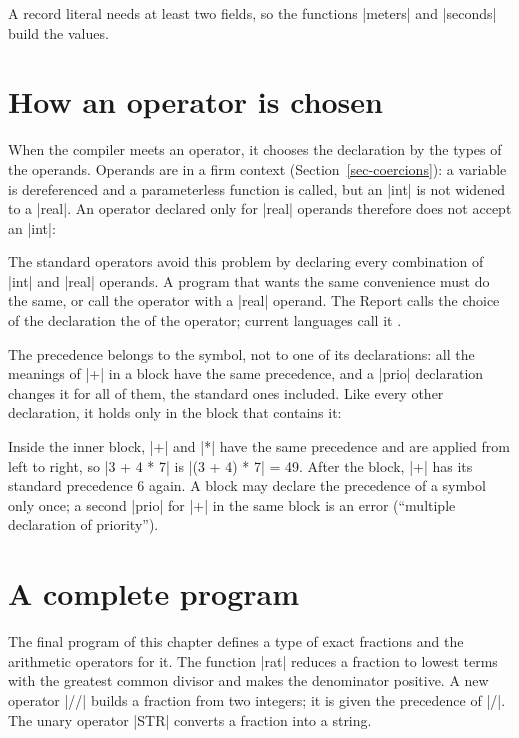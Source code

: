 
A record literal needs at least two fields, so the functions
\code|meters| and \code|seconds| build the values.

\section{How an operator is chosen}\label{sec-op-identification}

When the compiler meets an operator, it chooses the declaration by the
types of the operands. Operands are in a firm context
(Section~\ref{sec-coercions}): a variable is dereferenced and a
parameterless function is called, but an \code|int| is not widened to a
\code|real|. An operator declared only for \code|real| operands therefore
does not accept an \code|int|:


The standard operators avoid this problem by declaring every combination
of \code|int| and \code|real| operands. A program that wants the same
convenience must do the same, or call the operator with a \code|real|
operand. The Report calls the choice of the declaration the
 of the operator; current languages call it
.

The precedence belongs to the symbol, not to one of its declarations: all
the meanings of \code|+| in a block have the same precedence, and a
\code|prio| declaration changes it for all of them, the standard ones
included. Like every other declaration, it holds only in the block that
contains it:


\noindent Inside the inner block, \code|+| and \code|*| have the same
precedence and are applied from left to right, so \code|3 + 4 * 7| is
\code|(3 + 4) * 7| = 49. After the block, \code|+| has its standard
precedence 6 again. A block may declare the precedence of a symbol only
once; a second \code|prio| for \code|+| in the same block is an error
(``multiple declaration of priority'').

\section{A complete program}\label{sec-procs-complete}

The final program of this chapter defines a type of exact fractions and
the arithmetic operators for it. The function \code|rat| reduces a
fraction to lowest terms with the greatest common divisor and makes the
denominator positive. A new operator \code|//| builds a fraction from two
integers; it is given the precedence of \code|/|. The unary operator
\code|STR| converts a fraction into a string.


